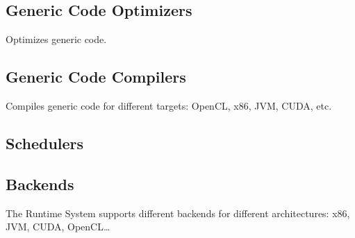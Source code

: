 \subsection{Generic Code Optimizers}
Optimizes generic code.

\subsection{Generic Code Compilers}
Compiles generic code for different targets: OpenCL, x86, JVM, CUDA, etc.

\subsection{Schedulers}

\subsection{Backends}
The Runtime System supports different backends for different architectures: x86, JVM, CUDA, OpenCL\ldots
